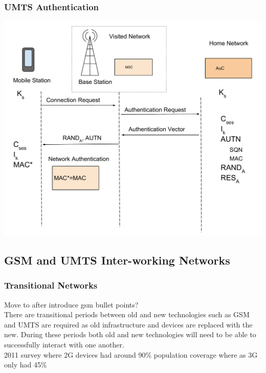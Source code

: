\documentclass{beamer}
\begin{document}
	\begin{frame}
	\frametitle{UMTS Authentication}
  \begin{center}
  \includegraphics[width=.9\textwidth, height=.85\textheight]{Images/UMTSAuthentication3.pdf}

  \end{center} 
	\end{frame}
\subsection{GSM and UMTS Inter-working Networks}
\begin{frame}
	\frametitle{Transitional Networks}
	Move to after introduce gsm
	 bullet points?\\
		There are transitional periods between old and new technologies such as GSM and UMTS are required as old infrastructure and devices are replaced with the new. During these periods both old and new technologies will need to be able to successfully interact with one another.
		\\2011 survey where 2G devices had around 90\% population coverage where as 3G only had 45\%
\end{frame}
\end{document}
